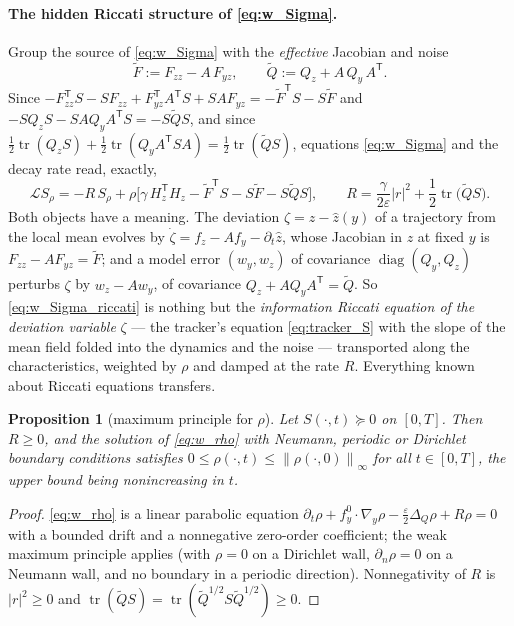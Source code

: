 \documentclass[11pt,a4paper]{article}
\newcommand{\tr}{\operatorname{tr}}
\newcommand{\T}{^{\mathsf T}}
\newcommand{\zh}{\hat{z}}
\newcommand{\Sr}{S_{\rho}}          %
\newcommand{\eps}{\varepsilon}
\newcommand{\norm}[1]{\left\lVert #1 \right\rVert}
\newcommand{\abs}[1]{\left\lvert #1 \right\rvert}
\newcommand{\gy}{\nabla_{\!y}}
\theoremstyle{plain}
\newtheorem{proposition}{Proposition}
\theoremstyle{definition}
\theoremstyle{remark}
\begin{document}
\paragraph{The hidden Riccati structure of \eqref{eq:w_Sigma}.}
Group the source of \eqref{eq:w_Sigma} with the \emph{effective} Jacobian and noise
\begin{equation}
  \tilde F := F_{zz} - A\,F_{yz}, \qquad \tilde Q := Q_z + A\,Q_y\,A\T .
  \label{eq:effective}
\end{equation}
Since $-F_{zz}\T S - SF_{zz} + F_{yz}\T A\T S + SAF_{yz} = -\tilde F\T S - S\tilde F$ and $-SQ_zS - SAQ_yA\T S = -S\tilde QS$, and since $\tfrac12\tr(Q_zS)+\tfrac12\tr(Q_yA\T SA) = \tfrac12\tr(\tilde QS)$, equations \eqref{eq:w_Sigma} and the decay rate read, exactly,
\begin{equation}
  \mathcal L\Sr = -R\,\Sr + \rho\Big[\gamma\,H_z\T H_z - \tilde F\T S - S\tilde F - S\tilde QS\Big],
  \qquad
  R = \frac{\gamma}{2\eps}\abs r^2 + \frac12\tr\big(\tilde Q S\big).
  \label{eq:w_Sigma_riccati}
\end{equation}
Both objects have a meaning. The deviation $\zeta = z-\zh(y)$ of a trajectory from the local mean evolves by $\dot\zeta = f_z - A f_y - \partial_t\zh$, whose Jacobian in $z$ at fixed $y$ is $F_{zz} - AF_{yz} = \tilde F$; and a model error $(w_y,w_z)$ of covariance $\operatorname{diag}(Q_y,Q_z)$ perturbs $\zeta$ by $w_z - Aw_y$, of covariance $Q_z + AQ_yA\T = \tilde Q$. So \eqref{eq:w_Sigma_riccati} is nothing but the \emph{information Riccati equation of the deviation variable} $\zeta$ --- the tracker's equation \eqref{eq:tracker_S} with the slope of the mean field folded into the dynamics and the noise --- transported along the characteristics, weighted by $\rho$ and damped at the rate $R$. Everything known about Riccati equations transfers.

\begin{proposition}[maximum principle for $\rho$]
Let $S(\cdot,t)\succeq0$ on $[0,T]$. Then $R\ge0$, and the solution of \eqref{eq:w_rho} with Neumann, periodic or Dirichlet boundary conditions satisfies $0\le\rho(\cdot,t)\le\norm{\rho(\cdot,0)}_\infty$ for all $t\in[0,T]$, the upper bound being nonincreasing in $t$.
\end{proposition}
\begin{proof}
\eqref{eq:w_rho} is a linear parabolic equation $\partial_t\rho + f_y^0\cdot\gy\rho - \tfrac\eps2\Delta_Q\rho + R\rho = 0$ with a bounded drift and a nonnegative zero-order coefficient; the weak maximum principle applies (with $\rho=0$ on a Dirichlet wall, $\partial_n\rho=0$ on a Neumann wall, and no boundary in a periodic direction). Nonnegativity of $R$ is $\abs r^2\ge0$ and $\tr(\tilde QS) = \tr(\tilde Q^{1/2}S\tilde Q^{1/2})\ge0$.
\end{proof}
\end{document}
